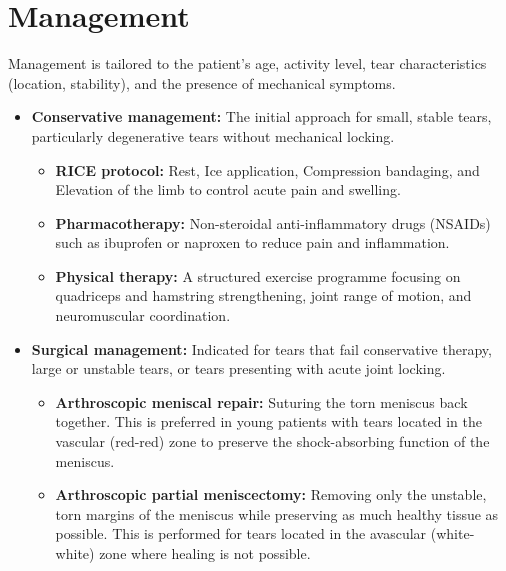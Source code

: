 \section*{Management}
Management is tailored to the patient's age, activity level, tear characteristics (location, stability), and the presence of mechanical symptoms.
\begin{itemize}
    \item \textbf{Conservative management:} The initial approach for small, stable tears, particularly degenerative tears without mechanical locking.
        \begin{itemize}
            \item \textbf{RICE protocol:} Rest, Ice application, Compression bandaging, and Elevation of the limb to control acute pain and swelling.
            \item \textbf{Pharmacotherapy:} Non-steroidal anti-inflammatory drugs (NSAIDs) such as ibuprofen or naproxen to reduce pain and inflammation.
            \item \textbf{Physical therapy:} A structured exercise programme focusing on quadriceps and hamstring strengthening, joint range of motion, and neuromuscular coordination.
        \end{itemize}
    \item \textbf{Surgical management:} Indicated for tears that fail conservative therapy, large or unstable tears, or tears presenting with acute joint locking.
        \begin{itemize}
            \item \textbf{Arthroscopic meniscal repair:} Suturing the torn meniscus back together. This is preferred in young patients with tears located in the vascular (red-red) zone to preserve the shock-absorbing function of the meniscus.
            \item \textbf{Arthroscopic partial meniscectomy:} Removing only the unstable, torn margins of the meniscus while preserving as much healthy tissue as possible. This is performed for tears located in the avascular (white-white) zone where healing is not possible.
        \end{itemize}
\end{itemize}

